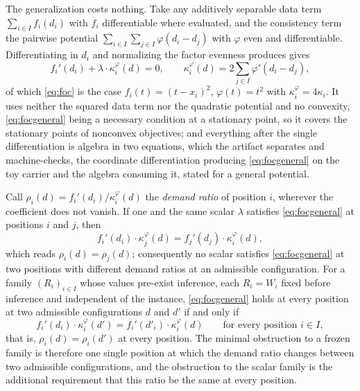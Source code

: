 The generalization costs nothing. Take any additively separable data term $\sum_{i \in I} f_i(d_i)$ with $f_i$ differentiable where evaluated, and the consistency term the pairwise potential $\sum_{i \in I} \sum_{j \in I} \varphi(d_i - d_j)$ with $\varphi$ even and differentiable. Differentiating in $d_i$ and normalizing the factor evenness produces gives
\begin{equation}
f_i'(d_i) + \lambda \cdot \kappa_i^{\varphi}(d) = 0, \qquad \kappa_i^{\varphi}(d) = 2 \sum_{j \in I} \varphi'(d_i - d_j),
\label{eq:focgeneral}
\end{equation}
of which \eqref{eq:foc} is the case $f_i(t) = (t - x_i)^2$, $\varphi(t) = t^2$ with $\kappa_i^{\varphi} = 4 \kappa_i$. It uses neither the squared data term nor the quadratic potential and no convexity, \eqref{eq:focgeneral} being a necessary condition at a stationary point, so it covers the stationary points of nonconvex objectives; and everything after the single differentiation is algebra in two equations, which the artifact separates and machine-checks, the coordinate differentiation producing \eqref{eq:focgeneral} on the toy carrier and the algebra consuming it, stated for a general potential.

\begin{uprop}
Call $\rho_i(d) = f_i'(d_i)/\kappa_i^{\varphi}(d)$ the \emph{demand ratio} of position $i$, wherever the coefficient does not vanish. If one and the same scalar $\lambda$ satisfies \eqref{eq:focgeneral} at positions $i$ and $j$, then
\begin{equation}
f_i'(d_i) \cdot \kappa_j^{\varphi}(d) = f_j'(d_j) \cdot \kappa_i^{\varphi}(d),
\label{eq:proportiongeneral}
\end{equation}
which reads $\rho_i(d) = \rho_j(d)$; consequently no scalar satisfies \eqref{eq:focgeneral} at two positions with different demand ratios at an admissible configuration. For a family $(R_i)_{i \in I}$ whose values pre-exist inference, each $R_i = W_i$ fixed before inference and independent of the instance, \eqref{eq:focgeneral} holds at every position at two admissible configurations $d$ and $d'$ if and only if
\begin{equation}
f_i'(d_i) \cdot \kappa_i^{\varphi}(d') = f_i'(d'_i) \cdot \kappa_i^{\varphi}(d) \qquad \text{for every position } i \in I,
\label{eq:tablecondition}
\end{equation}
that is, $\rho_i(d) = \rho_i(d')$ at every position. The minimal obstruction to a frozen family is therefore one single position at which the demand ratio changes between two admissible configurations, and the obstruction to the scalar family is the additional requirement that this ratio be the same at every position.
\end{uprop}

